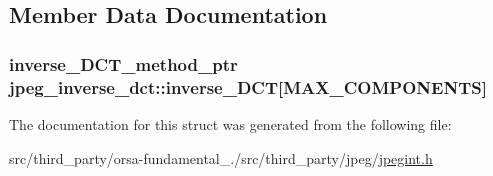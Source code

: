 \subsection{Member Data Documentation}
\hypertarget{structjpeg__inverse__dct_aa05e35a50f28daf199d2efa702a72c2a}{}
\subsubsection[{inverse\+\_\+\+D\+C\+T}]{\setlength{\rightskip}{0pt plus 5cm}inverse\+\_\+\+D\+C\+T\+\_\+method\+\_\+ptr jpeg\+\_\+inverse\+\_\+dct\+::inverse\+\_\+\+D\+C\+T\mbox{[}{\bf M\+A\+X\+\_\+\+C\+O\+M\+P\+O\+N\+E\+N\+T\+S}\mbox{]}}\label{structjpeg__inverse__dct_aa05e35a50f28daf199d2efa702a72c2a}


The documentation for this struct was generated from the following file\+:\begin{DoxyCompactItemize}
\item 
src/third\+\_\+party/orsa-\/fundamental\+\_./src/third\+\_\+party/jpeg/\hyperlink{jpegint_8h}{jpegint.\+h}\end{DoxyCompactItemize}
